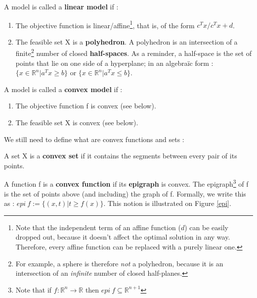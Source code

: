 \begin{definition}
A model is called a \textbf{linear model} if :
\begin{enumerate}
  \item The objective function is linear/affine\footnote{Note that the independent term of an affine function ($d$) can be easily dropped out, because it doesn't affect the optimal solution in any way. Therefore, every affine function can be replaced with a purely linear one.}, that is, of the form $c^T x/c^T x +d$.
  \item The feasible set X is a \textbf{polyhedron}. A polyhedron is an intersection of a finite\footnote{For example, a sphere is therefore \textit{not} a polyhedron, because it is an intersection of an \textit{infinite} number of closed half-planes.} number of closed \textbf{half-spaces}. As a reminder, a half-space is the set of points that lie on one side of a hyperplane; in an algebraïc form : $\{x \in \mathbb{R}^n | a^T x \geq b\}$ or $\{x \in \mathbb{R}^n | a^T x \leq b\}$.
\end{enumerate}
\end{definition}

\vspace{\baselineskip}
		
\begin{definition}
A model is called a \textbf{convex model} if :
\begin{enumerate}
  \item The objective function f is convex (see below). 
  \item The feasible set X is convex (see below).
\end{enumerate}
\end{definition}

We still need to define what are convex functions and sets :\\

\begin{definition}
    A set X is a \textbf{convex set} if it contains the segments between every pair of its points.
\end{definition}

\vspace{\baselineskip}

\begin{definition}
    A function f is a \textbf{convex function} if its \textbf{epigraph} is convex. The epigraph\footnote{Note that if $f : \mathbb{R}^n \to \mathbb{R}$ then $epi \: f \subseteq \mathbb{R}^{n+1}$} of f is the set of points above (and including) the graph of f. Formally, we write this as : $epi \: f := \{(x,t)|t \geq f(x)\} $. This notion is illustrated on Figure \ref{epi}.
\end{definition}

